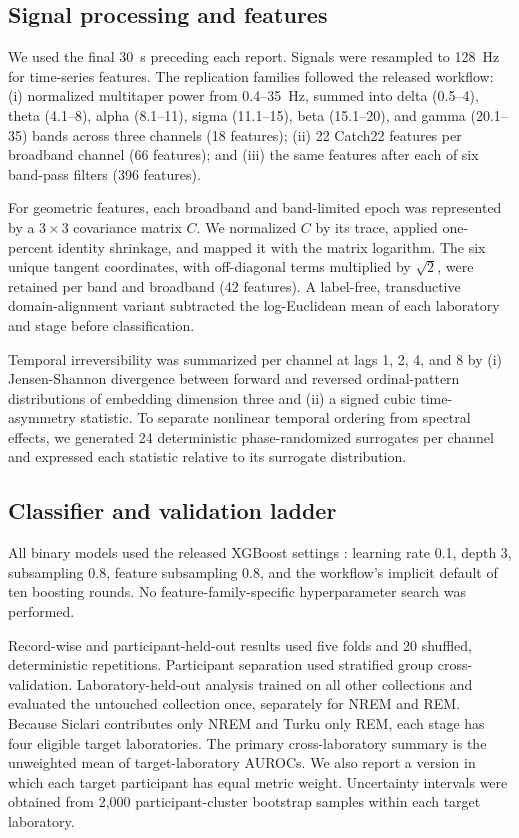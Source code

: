 \documentclass[10pt,twocolumn]{article}
\begin{document}
\subsection{Signal processing and features}

We used the final 30~s preceding each report. Signals were resampled to 128~Hz
for time-series features. The replication families followed the released
workflow: (i) normalized multitaper power from 0.4--35~Hz, summed into delta
(0.5--4), theta (4.1--8), alpha (8.1--11), sigma (11.1--15), beta
(15.1--20), and gamma (20.1--35) bands across three channels (18 features);
(ii) 22 Catch22 features per broadband channel (66 features); and (iii) the
same features after each of six band-pass filters (396 features).

For geometric features, each broadband and band-limited epoch was represented
by a $3\times3$ covariance matrix $C$. We normalized $C$ by its trace, applied
one-percent identity shrinkage, and mapped it with the matrix logarithm. The
six unique tangent coordinates, with off-diagonal terms multiplied by
$\sqrt{2}$, were retained per band and broadband (42 features). A label-free,
transductive domain-alignment variant subtracted the log-Euclidean mean of each
laboratory and stage before classification.

Temporal irreversibility was summarized per channel at lags 1, 2, 4, and 8 by
(i) Jensen-Shannon divergence between forward and reversed ordinal-pattern
distributions of embedding dimension three and (ii) a signed cubic time-
asymmetry statistic. To separate nonlinear temporal ordering from spectral
effects, we generated 24 deterministic phase-randomized surrogates per channel
and expressed each statistic relative to its surrogate distribution.

\subsection{Classifier and validation ladder}

All binary models used the released XGBoost settings
\citep{chen2016xgboost}: learning rate 0.1, depth 3, subsampling 0.8, feature
subsampling 0.8, and the workflow's implicit default of ten boosting rounds.
No feature-family-specific hyperparameter search was performed.

Record-wise and participant-held-out results used five folds and 20 shuffled,
deterministic repetitions. Participant separation used stratified group
cross-validation. Laboratory-held-out analysis trained on all other
collections and evaluated the untouched collection once, separately for NREM
and REM. Because Siclari contributes only NREM and Turku only REM, each stage
has four eligible target laboratories. The primary cross-laboratory summary is
the unweighted mean of target-laboratory AUROCs. We also report a version in
which each target participant has equal metric weight. Uncertainty intervals
were obtained from 2,000 participant-cluster bootstrap samples within each
target laboratory.
\end{document}
